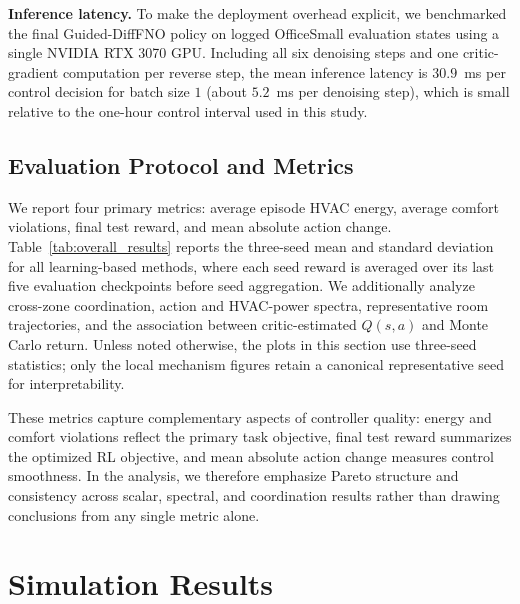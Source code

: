 \documentclass[lettersize,journal]{IEEEtran}
\theoremstyle{nonumberplain}     \theoremheaderfont{\bfseries\itshape}     \theorembodyfont{\normalfont}     \theoremseparator{:}     \theoremsymbol{\ensuremath{\blacksquare}}     \newtheorem{proof}{Proof}
\theoremstyle{plain}     \theoremheaderfont{\bfseries\itshape}     \theorembodyfont{\normalfont}     \theoremseparator{:}     \theoremsymbol{\ensuremath{\blacksquare}}     \newtheorem{remark}{Remark}
\begin{document}
\textbf{Inference latency.} To make the deployment overhead explicit, we benchmarked the final Guided-DiffFNO policy on logged OfficeSmall evaluation states using a single NVIDIA RTX 3070 GPU. Including all six denoising steps and one critic-gradient computation per reverse step, the mean inference latency is $30.9$~ms per control decision for batch size $1$ (about $5.2$~ms per denoising step), which is small relative to the one-hour control interval used in this study.

\subsection{Evaluation Protocol and Metrics}
We report four primary metrics: average episode HVAC energy, average comfort violations, final test reward, and mean absolute action change. Table~\ref{tab:overall_results} reports the three-seed mean and standard deviation for all learning-based methods, where each seed reward is averaged over its last five evaluation checkpoints before seed aggregation. We additionally analyze cross-zone coordination, action and HVAC-power spectra, representative room trajectories, and the association between critic-estimated $Q(s,a)$ and Monte Carlo return. Unless noted otherwise, the plots in this section use three-seed statistics; only the local mechanism figures retain a canonical representative seed for interpretability.

These metrics capture complementary aspects of controller quality: energy and comfort violations reflect the primary task objective, final test reward summarizes the optimized RL objective, and mean absolute action change measures control smoothness. In the analysis, we therefore emphasize Pareto structure and consistency across scalar, spectral, and coordination results rather than drawing conclusions from any single metric alone.

\providecommand{\resultfigdir}{figures}

\section{Simulation Results}
\label{sec:results}
\end{document}
